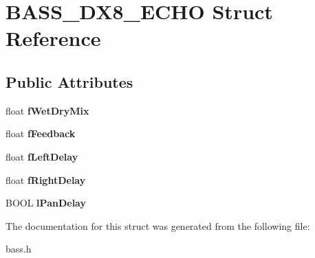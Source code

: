 \section{B\+A\+S\+S\+\_\+\+D\+X8\+\_\+\+E\+C\+H\+O Struct Reference}
\label{struct_b_a_s_s___d_x8___e_c_h_o}
\subsection*{Public Attributes}
\begin{DoxyCompactItemize}
\item 
float {\bfseries f\+Wet\+Dry\+Mix}\label{struct_b_a_s_s___d_x8___e_c_h_o_a6c2c28866ef373a669f059f335b6e0f6}

\item 
float {\bfseries f\+Feedback}\label{struct_b_a_s_s___d_x8___e_c_h_o_af0b5c7c7657e2c96594f328f4e864949}

\item 
float {\bfseries f\+Left\+Delay}\label{struct_b_a_s_s___d_x8___e_c_h_o_a191fa91199c5fe5577e01f245cc9eee9}

\item 
float {\bfseries f\+Right\+Delay}\label{struct_b_a_s_s___d_x8___e_c_h_o_a75637c3dcdc3336ff8b6a5dd119af276}

\item 
B\+O\+O\+L {\bfseries l\+Pan\+Delay}\label{struct_b_a_s_s___d_x8___e_c_h_o_a60032ed3f9846743ae53468309006a39}

\end{DoxyCompactItemize}


The documentation for this struct was generated from the following file\+:\begin{DoxyCompactItemize}
\item 
bass.\+h\end{DoxyCompactItemize}
